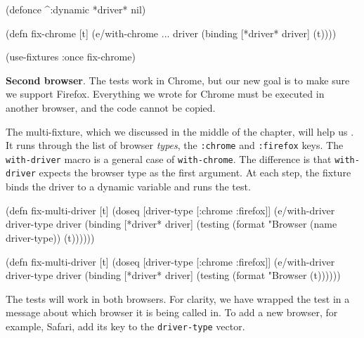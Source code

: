 \begin{english}
  \begin{clojure}
(defonce ^:dynamic *driver* nil)

(defn fix-chrome [t]
  (e/with-chrome {...} driver
    (binding [*driver* driver]
      (t))))

(use-fixtures :once fix-chrome)
  \end{clojure}
\end{english}

\textbf{Second browser}. The tests work in Chrome, but our new goal is to make sure we support Firefox. Everything we wrote for Chrome must be executed in another browser, and the code cannot be copied.

The multi-fixture, which we discussed in the middle of the chapter, will help us . It runs through the list of browser \emph{types}, the \verb|:chrome| and \verb|:firefox| keys. The \verb|with-driver| macro is a general case of \verb|with-chrome|. The difference is that \verb|with-driver| expects the browser type as the first argument. At each step, the fixture binds the driver to a dynamic variable and runs the test.

\ifx\DEVICETYPE\MOBILE

\begin{english}
  \begin{clojure}
(defn fix-multi-driver [t]
  (doseq [driver-type [:chrome :firefox]]
    (e/with-driver driver-type {} driver
      (binding [*driver* driver]
        (testing (format "Browser %
                   (name driver-type))
          (t))))))
  \end{clojure}
\end{english}

\else

\begin{english}
  \begin{clojure}
(defn fix-multi-driver [t]
  (doseq [driver-type [:chrome :firefox]]
    (e/with-driver driver-type {} driver
      (binding [*driver* driver]
        (testing (format "Browser %
          (t))))))
  \end{clojure}
\end{english}

\fi

The tests will work in both browsers. For clarity, we have wrapped the test in a message about which browser it is being called in. To add a new browser, for example, Safari, add its key to the \verb|driver-type| vector.

